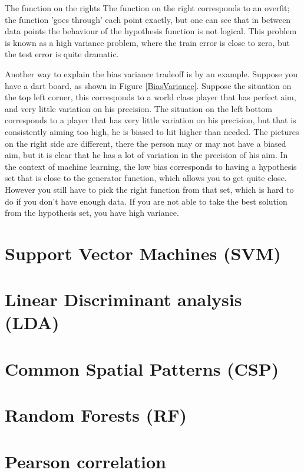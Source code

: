 The function on the rights The function on the right corresponds to an overfit; the function 'goes through' each point exactly, but one can see that in between data points the behaviour of the hypothesis function is not logical. This problem is known as a high variance problem, where the train error is close to zero, but the test error is quite dramatic. 


Another way to explain the bias variance tradeoff is by an example. Suppose you have a dart board, as shown in Figure \ref{BiasVariance}. Suppose the situation on the top left corner, this corresponds to a world class player that has perfect aim, and very little variation on his precision. The situation on the left bottom corresponds to a player that has very little variation on his precision, but that is consistently aiming too high, he is biased to hit higher than needed. The pictures on the right side are different, there the person may or may not have a biased aim, but it is clear that he has a lot of variation in the precision of his aim.
\npar
In the context of machine learning, the low bias corresponds to having a hypothesis set that is close to the generator function, which allows you to get quite close. However you still have to pick the right function from that set, which is hard to do if you don't have enough data. If you are not able to take the best solution from the hypothesis set, you have high variance.



\section{Support Vector Machines (SVM)}


\section{Linear Discriminant analysis (LDA)}


\section{Common Spatial Patterns (CSP)}


\section{Random Forests (RF)}

\section{Pearson correlation}
